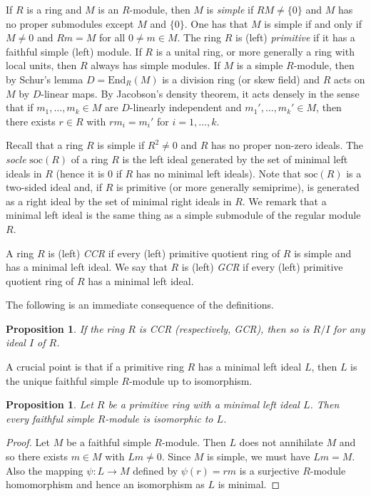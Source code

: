 \documentclass[11pt,reqno]{amsart}
\theoremstyle{plain}
\newtheorem{prop}[thm]{Proposition}
\numberwithin{equation}{section}
\begin{document}
If $R$ is a ring and $M$ is an $R$-module, then $M$ is \emph{simple} if $RM\neq \{0\}$ and $M$ has no proper submodules except $M$ and $\{0\}$.  One has that $M$ is simple if and only if $M\neq 0$ and $Rm=M$ for all $0\neq m\in M$.   The ring $R$ is (left) \emph{primitive} if it has  a faithful simple (left) module. If $R$ is a unital ring, or more generally a ring with local units, then $R$ always has simple modules.
 If $M$ is a simple $R$-module, then by Schur's lemma $D=\mathrm{End}_R(M)$ is a division ring (or skew field) and $R$ acts on $M$ by $D$-linear maps.  By Jacobson's density theorem, it acts densely in the sense that if $m_1,\ldots, m_k\in M$ are $D$-linearly independent and $m_1',\ldots, m_k'\in M$, then there exists $r\in R$ with $rm_i=m_i'$ for $i=1,\ldots, k$.

Recall that  a ring $R$ is simple if $R^2\neq 0$ and $R$ has no proper non-zero ideals.  The \emph{socle} $\mathrm{soc}(R)$ of a ring $R$ is the left ideal generated by the set of minimal left ideals in $R$ (hence it is $0$ if $R$ has no minimal left ideals).  Note that $\mathrm{soc}(R)$ is a two-sided ideal and, if $R$ is primitive (or more generally semiprime), is generated as a right ideal by the set of minimal right ideals in $R$.  We remark that a minimal left ideal is the same thing as a simple submodule of the regular module $R$.

\begin{dfn}[Kaplansky]
A ring $R$ is (left) \emph{CCR} if every (left) primitive quotient ring of $R$ is simple and has a minimal left ideal.  We say that $R$ is (left) \emph{GCR} if every (left) primitive quotient ring of $R$ has  a minimal left ideal.
\end{dfn}

The following is an immediate consequence of the definitions.

\begin{prop}\label{p:quotients.ccr}
If the ring $R$ is CCR (respectively, GCR), then so is $R/I$ for any ideal $I$ of $R$.
\end{prop}

A crucial point is that if a primitive ring $R$ has a minimal left ideal $L$, then $L$ is the unique faithful simple $R$-module up to isomorphism.

\begin{prop}\label{p:uniquesimple}
Let $R$ be a primitive ring with a minimal left ideal $L$.  Then every faithful simple $R$-module is isomorphic to $L$.
\end{prop}
\begin{proof}
Let $M$ be a faithful simple $R$-module.  Then $L$ does not annihilate $M$ and so there exists $m\in M$ with $Lm\neq 0$.  Since $M$ is simple, we must have $Lm=M$.  Also the mapping $\psi\colon L\to M$ defined by $\psi(r)=rm$ is a surjective $R$-module homomorphism and hence an isomorphism as $L$ is minimal.
\end{proof}
\end{document}
